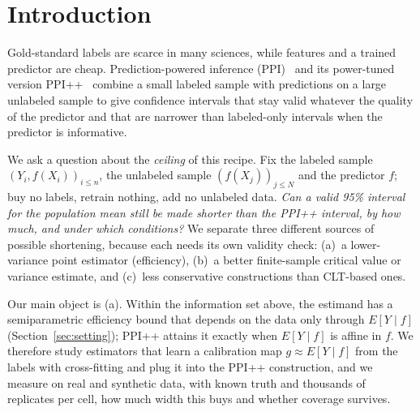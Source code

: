 \section{Introduction}
\label{sec:intro}
Gold-standard labels are scarce in many sciences, while features and a trained predictor are cheap. Prediction-powered inference (PPI)~\citep{angelopoulos2023ppi} and its power-tuned version PPI++~\citep{angelopoulos2023ppipp} combine a small labeled sample with predictions on a large unlabeled sample to give confidence intervals that stay valid whatever the quality of the predictor and that are narrower than labeled-only intervals when the predictor is informative.

We ask a question about the \emph{ceiling} of this recipe. Fix the labeled sample $(Y_i,f(X_i))_{i\le n}$, the unlabeled sample $(f(X_j))_{j\le N}$ and the predictor $f$; buy no labels, retrain nothing, add no unlabeled data. \emph{Can a valid 95\% interval for the population mean still be made shorter than the PPI++ interval, by how much, and under which conditions?} We separate three different sources of possible shortening, because each needs its own validity check: (a)~a lower-variance point estimator (efficiency), (b)~a better finite-sample critical value or variance estimate, and (c)~less conservative constructions than CLT-based ones.

Our main object is (a). Within the information set above, the estimand has a semiparametric efficiency bound that depends on the data only through $E[Y\mid f]$ (Section~\ref{sec:setting}); PPI++ attains it exactly when $E[Y\mid f]$ is affine in $f$. We therefore study estimators that learn a calibration map $g\approx E[Y\mid f]$ from the labels with cross-fitting and plug it into the PPI++ construction, and we measure on real and synthetic data, with known truth and thousands of replicates per cell, how much width this buys and whether coverage survives.

